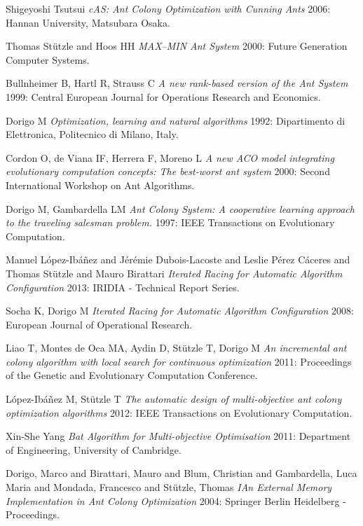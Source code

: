 \documentclass[12pt]{article}
\begin{document}
\begin{thebibliography}{1}
 Shigeyoshi Tsutsui {\em cAS: Ant Colony Optimization with Cunning
Ants} 2006: Hannan University, Matsubara Osaka.

 Thomas St{\"u}tzle and Hoos HH {\em MAX–MIN Ant System} 2000: Future Generation Computer Systems.

 Bullnheimer B, Hartl R, Strauss C {\em A new rank-based version of the
Ant System} 1999: Central European Journal for Operations Research and Economics.

 Dorigo M {\em Optimization, learning and natural algorithms} 1992: Dipartimento di Elettronica, Politecnico di Milano, Italy.

 Cordon O, de Viana IF, Herrera F, Moreno L {\em A new ACO model
integrating evolutionary computation concepts: The best-worst ant system} 2000: Second International Workshop on Ant Algorithms.

 Dorigo M, Gambardella LM {\em Ant Colony System: A cooperative learning approach to the traveling salesman problem.} 1997: IEEE Transactions on Evolutionary
Computation.

 Manuel L{\'o}pez-Ib{\'a}{\~n}ez  and  J{\'e}r{\'e}mie Dubois-Lacoste  and Leslie {P{\'e}rez C{\'a}ceres}  and  Thomas St{\"u}tzle  and  Mauro Birattari {\em Iterated Racing for Automatic Algorithm Configuration} 2013: IRIDIA - Technical Report Series.

 Socha K, Dorigo M {\em Iterated Racing for Automatic Algorithm Configuration} 2008: European Journal of Operational Research.
  
 Liao T, Montes de Oca MA, Aydin D, St{\"u}tzle T, Dorigo M {\em An incremental ant colony algorithm with local search for continuous optimization} 2011: Proceedings of the Genetic and Evolutionary
Computation Conference.  
  
 L{\'o}pez-Ib{\'a}{\~n}ez M, St{\"u}tzle T {\em The automatic design of multi-objective ant colony optimization algorithms} 2012: IEEE Transactions on Evolutionary Computation.    
  
 Xin-She Yang {\em Bat Algorithm for Multi-objective Optimisation} 2011: Department of Engineering, University of Cambridge.  
 
 
 Dorigo, Marco
and Birattari, Mauro
and Blum, Christian
and Gambardella, Luca Maria
and Mondada, Francesco
and St{\"u}tzle, Thomas {\em IAn External Memory Implementation in Ant Colony Optimization} 2004: Springer Berlin Heidelberg - Proceedings.

\end{thebibliography}

 
\end{document}
